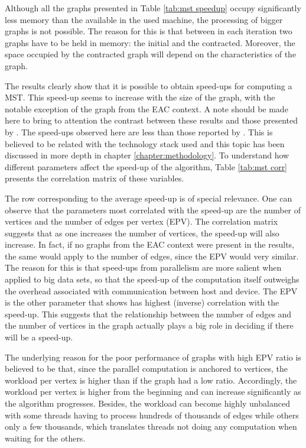 

Although all the graphs presented in Table \ref{tab:mst speedup} occupy significantly less memory than the available in the used machine, the processing of bigger graphs is not possible.
The reason for this is that between in each iteration two graphs have to be held in memory: the initial and the contracted.
Moreover, the space occupied by the contracted graph will depend on the characteristics of the graph.

The results clearly show that it is possible to obtain speed-ups for computing a MST.
This speed-up seems to increase with the size of the graph, with the notable exception of the graph from the EAC context.
A note should be made here to bring to attention the contrast between these results and those presented by \citet{Sousa2015}.
The speed-ups observed here are less than those reported by \citet{Sousa2015}.
This is believed to be related with the technology stack used and this topic has been discussed in more depth in chapter \ref{chapter:methodology}.
To understand how different parameters affect the speed-up of the algorithm, Table \ref{tab:mst corr} presents the correlation matrix of these variables.



The row corresponding to the average speed-up is of special relevance.
One can observe that the parameters most correlated with the speed-up are the number of vertices and the number of edges per vertex (EPV).
The correlation matrix suggests that as one increases the number of vertices, the speed-up will also increase.
In fact, if no graphs from the EAC context were present in the results, the same would apply to the number of edges, since the EPV would very similar.
The reason for this is that speed-ups from parallelism are more salient when applied to big data sets, so that the speed-up of the computation itself outweighs the overhead associated with communication between host and device.
The EPV is the other parameter that shows has highest (inverse) correlation with the speed-up.
This suggests that the relationship between the number of edges and the number of vertices in the graph actually plays a big role in deciding if there will be a speed-up.

The underlying reason for the poor performance of graphs with high EPV ratio is believed to be that, since the parallel computation is anchored to vertices, the workload per vertex is higher than if the graph had a low ratio.
Accordingly, the workload per vertex is higher from the beginning and can increase significantly as the algorithm progresses.
Besides, the workload can become highly unbalanced with some threads having to process hundreds of thousands of edges while others only a few thousands, which translates threads not doing any computation when waiting for the others.

